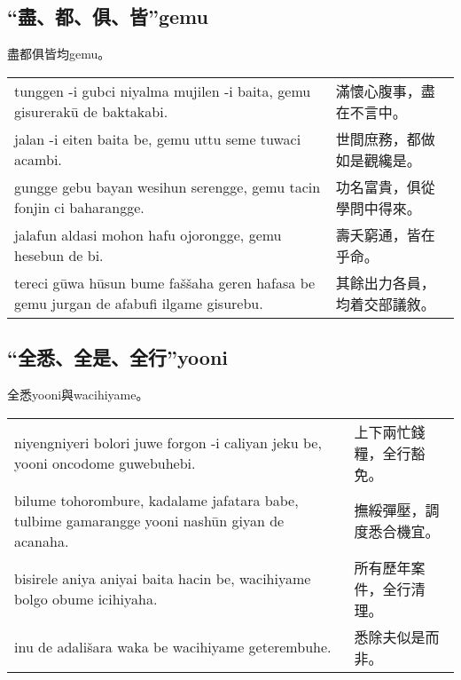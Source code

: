 \documentclass{article}
\begin{document}
\subsection{“盡、都、俱、皆”gemu}
\noindent 盡都俱皆均gemu。
\begin{center}
    \begin{tabularx}{\textwidth}{XX}
        tunggen -i gubci niyalma mujilen -i baita, gemu gisurerak\={u} de baktakabi. & 滿懷心腹事，盡在不言中。\\
        jalan -i eiten baita be, gemu uttu seme tuwaci acambi. & 世間庶務，都做如是觀纔是。\\
        gungge gebu bayan wesihun serengge, gemu tacin fonjin ci baharangge. & 功名富貴，俱從學問中得來。\\
        jalafun aldasi mohon hafu ojorongge, gemu hesebun de bi. & 壽夭窮通，皆在乎命。\\
        tereci g\={u}wa h\={u}sun bume fa\v{s}\v{s}aha geren hafasa be gemu jurgan de afabufi ilgame gisurebu. &其餘出力各員，均着交部議敘。
    \end{tabularx}
\end{center}

\subsection{“全悉、全是、全行”yooni}
\noindent 全悉yooni與wacihiyame。
\begin{center}
    \begin{tabularx}{\textwidth}{XX}
        niyengniyeri bolori juwe forgon -i caliyan jeku be, yooni oncodome guwebuhebi. & 上下兩忙錢糧，全行豁免。\\
        bilume tohorombure, kadalame jafatara babe, tulbime gamarangge yooni nash\={u}n giyan de acanaha. & 撫綏彈壓，調度悉合機宜。\\
        bisirele aniya aniyai baita hacin be, wacihiyame bolgo obume icihiyaha. & 所有歷年案件，全行清理。\\
        inu de adali\v{s}ara waka be wacihiyame geterembuhe. & 悉除夫似是而非。
    \end{tabularx}
\end{center}
\end{document}
